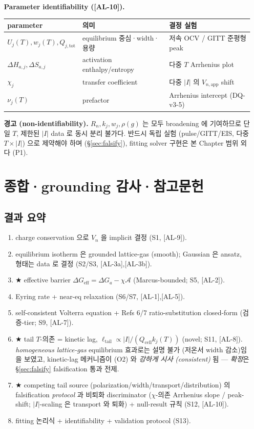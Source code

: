 \documentclass[11pt,a4paper]{article}
\newcommand{\eff}{\mathrm{eff}}
\newcommand{\app}{\mathrm{app}}
\newcommand{\tot}{\mathrm{tot}}
\newcommand{\cell}{\mathrm{cell}}
\newcommand{\AL}[1]{\textsf{[AL-#1]}}
\begin{document}
\textbf{Parameter identifiability (\AL{10}).}
\begin{longtable}{p{} p{} p{}}
\toprule parameter & 의미 & 결정 실험 \\ \midrule \endhead
$U_j(T),w_j(T),Q_{j,\tot}$ & equilibrium 중심·width·용량 & 저속 OCV / GITT 준평형 peak \\
$\Delta H_{a,j},\Delta S_{a,j}$ & activation enthalpy/entropy & 다중 $T$ Arrhenius plot \\
$\chi_j$ & transfer coefficient & 다중 $|I|$ 의 $V_{n,\app}$ shift \\
$\nu_j(T)$ & prefactor & Arrhenius intercept (DQ-v3-5) \\
\bottomrule
\end{longtable}
\textbf{경고 (non-identifiability).} $R_n,k_j,w_j,\rho(g)$ 는 모두 broadening 에 기여하므로
단일 $T$, 제한된 $|I|$ data 로 동시 분리 불가다. 반드시 독립 실험 (pulse/GITT/EIS, 다중
$T\times|I|$) 으로 제약해야 하며 (\S\ref{sec:falsify}), fitting solver 구현은 본 Chapter
범위 외다 (P1).

\section{종합·grounding 감사·참고문헌}\label{sec:summary}
\subsection{결과 요약}
\begin{enumerate}[label=\textbf{(R\arabic*)}]
\item charge conservation 으로 $V_n$ 을 implicit 결정 (S1, \AL{9}).
\item equilibrium isotherm 은 grounded lattice-gas (smooth); Gaussian 은 ansatz, 형태는
  data 로 결정 (S2/S3, \AL{3a},\AL{3b}).
\item ★ effective barrier $\Delta G_\eff=\Delta G_a-\chi\mathcal A$ (Marcus-bounded; S5, \AL{2}).
\item Eyring rate + near-eq relaxation (S6/S7, \AL{1},\AL{5}).
\item self-consistent Volterra equation + Refs 6/7 ratio-substitution closed-form
  (검증-tier; S9, \AL{7}).
\item ★ tail $T$-의존 = kinetic lag, $\ell_{\mathrm{tail}}\propto|I|/(Q_\cell k_j(T))$
  (novel; S11, \AL{8}). \emph{homogeneous lattice-gas} equilibrium 효과로는 설명 불가
  (저온서 width 감소)임을 보였고, kinetic-lag 메커니즘이 (O2) 와 \emph{강하게 시사
  (consistent)} 됨 — \emph{확정}은 \S\ref{sec:falsify} falsification 통과 전제.
\item ★ competing tail source (polarization/width/transport/distribution) 의
  falsification \emph{protocol} 과 비퇴화 discriminator ($\chi$-의존 Arrhenius slope /
  peak-shift; $|I|$-scaling 은 transport 와 퇴화) + null-result 규칙 (S12, \AL{10}).
\item fitting 논리식 + identifiability + validation protocol (S13).
\end{enumerate}
\end{document}
